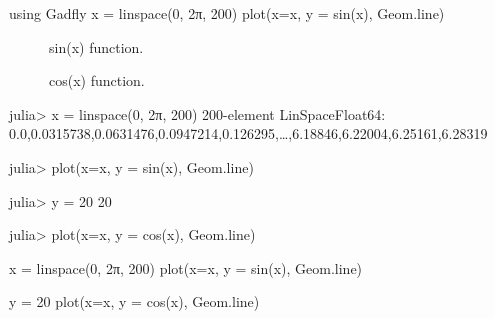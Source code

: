 \begin{juliacode}
using Gadfly
x = linspace(0, 2π, 200)
plot(x=x, y = sin(x), Geom.line)
\end{juliacode}
\begin{figure}[ht]
\center
\resizebox{\linewidth}{!}{}
\caption{sin(x) function.}
\label{fig:sin_fun}
\end{figure}

\begin{figure}[htpb]
\center
\resizebox{\linewidth}{!}{}
\caption{cos(x) function.}
\end{figure}

\resizebox{\linewidth}{!}{}

\begin{juliaterm}
julia> x = linspace(0, 2π, 200)
200-element LinSpace{Float64}:
 0.0,0.0315738,0.0631476,0.0947214,0.126295,…,6.18846,6.22004,6.25161,6.28319

julia> plot(x=x, y = sin(x), Geom.line)

\end{juliaterm}
\resizebox{\linewidth}{!}{}

\begin{juliaterm}
julia> y = 20
20

julia> plot(x=x, y = cos(x), Geom.line)

\end{juliaterm}
\resizebox{\linewidth}{!}{}

\begin{juliacode}
x = linspace(0, 2π, 200)
plot(x=x, y = sin(x), Geom.line)
\end{juliacode}
\resizebox{15cm}{!}{}

\begin{juliacode}
y = 20
plot(x=x, y = cos(x), Geom.line)
\end{juliacode}
\resizebox{15cm}{!}{}
